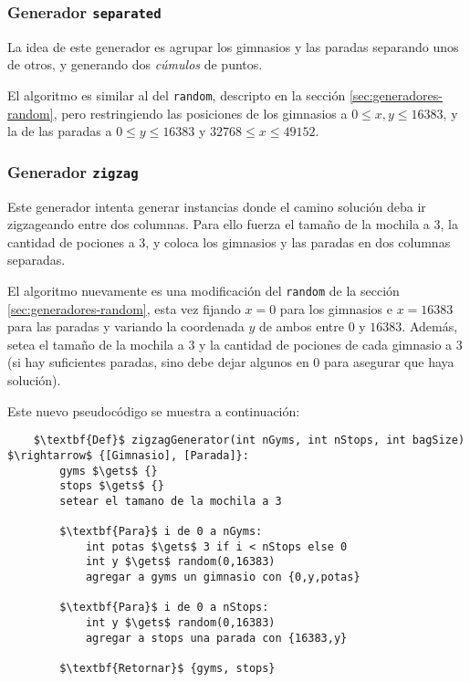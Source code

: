 \subsubsection{Generador \texttt{separated}}

La idea de este generador es agrupar los gimnasios y las paradas separando unos de otros,
y generando dos \textit{cúmulos} de puntos.

El algoritmo es similar al del \texttt{random}, descripto en la sección \ref{sec:generadores-random}, pero restringiendo las posiciones de los gimnasios a $0 \leq x,y \leq 16383$, y la de las paradas a $0 \leq y \leq 16383$ y $32768 \leq x \leq 49152$.

\subsubsection{Generador \texttt{zigzag}}

Este generador intenta generar instancias donde el camino solución deba ir zigzageando entre dos columnas. Para ello fuerza el tamaño de la mochila a 3, la cantidad de pociones a 3, y coloca los gimnasios y las paradas en dos columnas separadas.

El algoritmo nuevamente es una modificación del \texttt{random} de la sección \ref{sec:generadores-random},
esta vez fijando $x = 0$ para los gimnasios e $x = 16383$ para las paradas y variando la coordenada $y$ de ambos entre $0$ y $16383$.
Además, setea el tamaño de la mochila a $3$ y la cantidad de pociones de cada gimnasio a $3$ (si hay suficientes paradas, sino debe dejar algunos en 0 para asegurar que haya solución).

Este nuevo pseudocódigo se muestra a continuación:

\begin{lstlisting}
    $\textbf{Def}$ zigzagGenerator(int nGyms, int nStops, int bagSize) $\rightarrow$ {[Gimnasio], [Parada]}:
        gyms $\gets$ {}
        stops $\gets$ {}
        setear el tamano de la mochila a 3

        $\textbf{Para}$ i de 0 a nGyms:
            int potas $\gets$ 3 if i < nStops else 0
            int y $\gets$ random(0,16383)
            agregar a gyms un gimnasio con {0,y,potas}

        $\textbf{Para}$ i de 0 a nStops:
            int y $\gets$ random(0,16383)
            agregar a stops una parada con {16383,y}

        $\textbf{Retornar}$ {gyms, stops}
\end{lstlisting}
